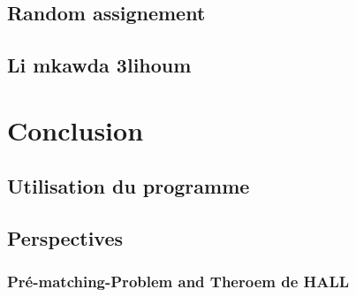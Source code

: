 \documentclass[12pt,titlepage]{article}
\begin{document}
\subsection{Random assignement}

\subsection{Li mkawda 3lihoum}

\section{Conclusion}

\subsection{Utilisation du programme}


\subsection{Perspectives}

\subsubsection{Pré-matching-Problem and Theroem de HALL}
\end{document}
